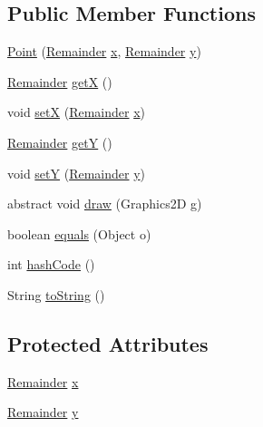 \subsection*{Public Member Functions}
\begin{DoxyCompactItemize}
\item 
\mbox{\hyperlink{classsnakegame_1_1structs_1_1_point_a79325ac308e18b3dd2721fcfa44752bd}{Point}} (\mbox{\hyperlink{classsnakegame_1_1structs_1_1_remainder}{Remainder}} \mbox{\hyperlink{classsnakegame_1_1structs_1_1_point_acf6c91ee7cda0e65a8054ff0dc07b79a}{x}}, \mbox{\hyperlink{classsnakegame_1_1structs_1_1_remainder}{Remainder}} \mbox{\hyperlink{classsnakegame_1_1structs_1_1_point_a2a9fe55d9cf57dbc120bbce39313d38d}{y}})
\item 
\mbox{\hyperlink{classsnakegame_1_1structs_1_1_remainder}{Remainder}} \mbox{\hyperlink{classsnakegame_1_1structs_1_1_point_a6dd8ef89102d12ec0cf5db0c03a568eb}{getX}} ()
\item 
void \mbox{\hyperlink{classsnakegame_1_1structs_1_1_point_a9efa9a335cccdbf667d1304c123e7ca9}{setX}} (\mbox{\hyperlink{classsnakegame_1_1structs_1_1_remainder}{Remainder}} \mbox{\hyperlink{classsnakegame_1_1structs_1_1_point_acf6c91ee7cda0e65a8054ff0dc07b79a}{x}})
\item 
\mbox{\hyperlink{classsnakegame_1_1structs_1_1_remainder}{Remainder}} \mbox{\hyperlink{classsnakegame_1_1structs_1_1_point_a920963cbc293b477335d7dc931ffb306}{getY}} ()
\item 
void \mbox{\hyperlink{classsnakegame_1_1structs_1_1_point_a9d42e4e18c765dcbfd14ef4baa102367}{setY}} (\mbox{\hyperlink{classsnakegame_1_1structs_1_1_remainder}{Remainder}} \mbox{\hyperlink{classsnakegame_1_1structs_1_1_point_a2a9fe55d9cf57dbc120bbce39313d38d}{y}})
\item 
abstract void \mbox{\hyperlink{classsnakegame_1_1structs_1_1_point_ab90de88df6692023c7e156d45f3e5417}{draw}} (Graphics2D g)
\item 
boolean \mbox{\hyperlink{classsnakegame_1_1structs_1_1_point_a46a08a1ffaa9cf65bab5527e620c0127}{equals}} (Object o)
\item 
int \mbox{\hyperlink{classsnakegame_1_1structs_1_1_point_a29332641bab79c8e403a6429d640e5f7}{hash\+Code}} ()
\item 
String \mbox{\hyperlink{classsnakegame_1_1structs_1_1_point_aec9ad3287697d952ab40687f5459241b}{to\+String}} ()
\end{DoxyCompactItemize}
\subsection*{Protected Attributes}
\begin{DoxyCompactItemize}
\item 
\mbox{\hyperlink{classsnakegame_1_1structs_1_1_remainder}{Remainder}} \mbox{\hyperlink{classsnakegame_1_1structs_1_1_point_acf6c91ee7cda0e65a8054ff0dc07b79a}{x}}
\item 
\mbox{\hyperlink{classsnakegame_1_1structs_1_1_remainder}{Remainder}} \mbox{\hyperlink{classsnakegame_1_1structs_1_1_point_a2a9fe55d9cf57dbc120bbce39313d38d}{y}}
\end{DoxyCompactItemize}


